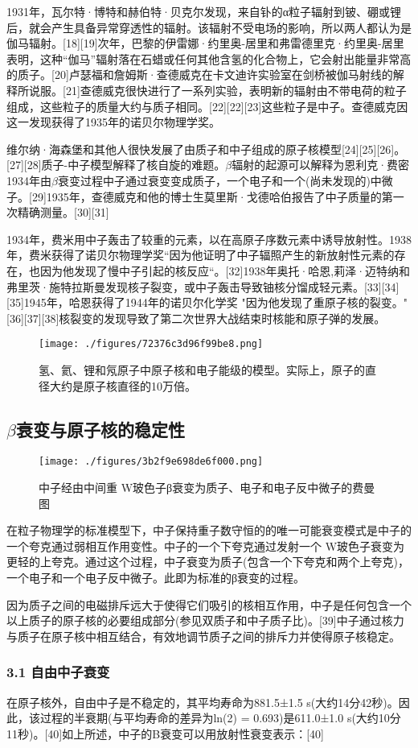 1931年，瓦尔特·博特和赫伯特·贝克尔发现，来自钋的α粒子辐射到铍、硼或锂后，就会产生具备异常穿透性的辐射。该辐射不受电场的影响，所以两人都认为是伽马辐射。[18][19]次年，巴黎的伊雷娜·约里奥-居里和弗雷德里克·约里奥-居里表明，这种“伽马”辐射落在石蜡或任何其他含氢的化合物上，它会射出能量非常高的质子。[20]卢瑟福和詹姆斯·查德威克在卡文迪许实验室在剑桥被伽马射线的解释所说服。[21]查德威克很快进行了一系列实验，表明新的辐射由不带电荷的粒子组成，这些粒子的质量大约与质子相同。[22][22][23]这些粒子是中子。查德威克因这一发现获得了1935年的诺贝尔物理学奖。

维尔纳·海森堡和其他人很快发展了由质子和中子组成的原子核模型[24][25][26]。[27][28]质子-中子模型解释了核自旋的难题。$\beta$辐射的起源可以解释为恩利克·费密1934年由$\beta$衰变过程中子通过衰变变成质子，一个电子和一个(尚未发现的)中微子。[29]1935年，查德威克和他的博士生莫里斯·戈德哈伯报告了中子质量的第一次精确测量。[30][31]

1934年，费米用中子轰击了较重的元素，以在高原子序数元素中诱导放射性。1938年，费米获得了诺贝尔物理学奖“因为他证明了中子辐照产生的新放射性元素的存在，也因为他发现了慢中子引起的核反应“。[32]1938年奥托·哈恩,莉泽·迈特纳和弗里茨·施特拉斯曼发现核子裂变，或中子轰击导致铀核分馏成轻元素。[33][34][35]1945年，哈恩获得了1944年的诺贝尔化学奖 "因为他发现了重原子核的裂变。"[36][37][38]核裂变的发现导致了第二次世界大战结束时核能和原子弹的发展。
\begin{figure}[ht]
\centering
\texttt{[image: ./figures/72376c3d96f99be8.png]}
\caption{氢、氦、锂和氖原子中原子核和电子能级的模型。实际上，原子的直径大约是原子核直径的10万倍。} \label{fig_Neutro_2}
\end{figure}

\subsection{$\beta$衰变与原子核的稳定性}
\begin{figure}[ht]
\centering
\texttt{[image: ./figures/3b2f9e698de6f000.png]}
\caption{中子经由中间重 W玻色子β衰变为质子、电子和电子反中微子的费曼图} \label{fig_Neutro_3}
\end{figure}
在粒子物理学的标准模型下，中子保持重子数守恒的的唯一可能衰变模式是中子的一个夸克通过弱相互作用变性。中子的一个下夸克通过发射一个 W玻色子衰变为更轻的上夸克。通过这个过程，中子衰变为质子(包含一个下夸克和两个上夸克)，一个电子和一个电子反中微子。此即为标准的β衰变的过程。

因为质子之间的电磁排斥远大于使得它们吸引的核相互作用，中子是任何包含一个以上质子的原子核的必要组成部分(参见双质子和中子质子比)。[39]中子通过核力与质子在原子核中相互结合，有效地调节质子之间的排斥力并使得原子核稳定。

\subsubsection{3.1 自由中子衰变}
在原子核外，自由中子是不稳定的，其平均寿命为881.5±1.5 s(大约14分42秒)。因此，该过程的半衰期(与平均寿命的差异为ln(2) = 0.693)是611.0±1.0 s(大约10分11秒)。[40]如上所述，中子的Β衰变可以用放射性衰变表示：[40]








